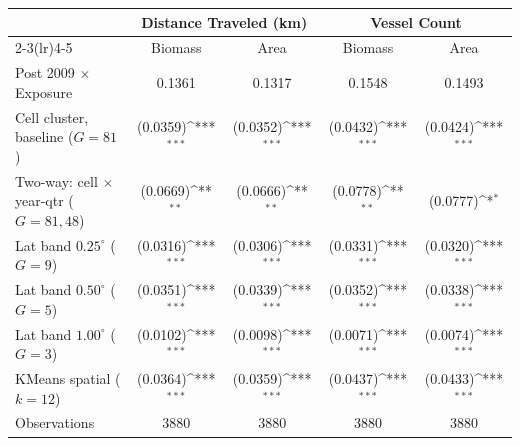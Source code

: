\def\sym#1{\ifmmode^{#1}\else\(^{#1}\)\fi}
\begin{tabular}{l*{4}{c}}
\hline\hline
 &\multicolumn{2}{c}{Distance Traveled (km)}&\multicolumn{2}{c}{Vessel Count}\\
\cmidrule(lr){2-3}\cmidrule(lr){4-5}
 &\multicolumn{1}{c}{Biomass}&\multicolumn{1}{c}{Area}&\multicolumn{1}{c}{Biomass}&\multicolumn{1}{c}{Area}\\
\hline
Post 2009 $\times$ Exposure & 0.1361 & 0.1317 & 0.1548 & 0.1493\\
[0.3em]
\quad Cell cluster, baseline ($G=81$) & (0.0359)\sym{***} & (0.0352)\sym{***} & (0.0432)\sym{***} & (0.0424)\sym{***}\\
\quad Two-way: cell $\times$ year-qtr ($G=81,48$) & (0.0669)\sym{**} & (0.0666)\sym{**} & (0.0778)\sym{**} & (0.0777)\sym{*}\\
\quad Lat band $0.25^\circ$ ($G=9$) & (0.0316)\sym{***} & (0.0306)\sym{***} & (0.0331)\sym{***} & (0.0320)\sym{***}\\
\quad Lat band $0.50^\circ$ ($G=5$) & (0.0351)\sym{***} & (0.0339)\sym{***} & (0.0352)\sym{***} & (0.0338)\sym{***}\\
\quad Lat band $1.00^\circ$ ($G=3$) & (0.0102)\sym{***} & (0.0098)\sym{***} & (0.0071)\sym{***} & (0.0074)\sym{***}\\
\quad KMeans spatial ($k=12$) & (0.0364)\sym{***} & (0.0359)\sym{***} & (0.0437)\sym{***} & (0.0433)\sym{***}\\
\hline
Observations & 3880 & 3880 & 3880 & 3880\\
\hline\hline
\end{tabular}